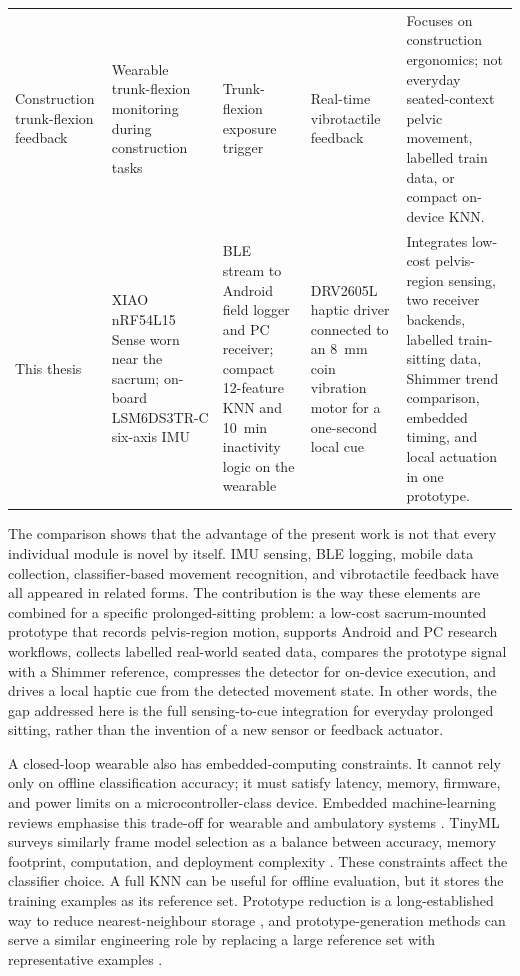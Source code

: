 \begin{table}[!tbp]
\begin{tabularx}{\textwidth}{p{}p{}p{}p{}X}
        Construction trunk-flexion feedback \cite{patel2023trunk_flexion_vibrotactile}
            & Wearable trunk-flexion monitoring during construction tasks
            & Trunk-flexion exposure trigger
            & Real-time vibrotactile feedback
            & Focuses on construction ergonomics; not everyday seated-context pelvic movement, labelled train data, or compact on-device KNN. \\
        This thesis
            & XIAO nRF54L15 Sense worn near the sacrum; on-board LSM6DS3TR-C six-axis IMU
            & BLE stream to Android field logger and PC receiver; compact 12-feature KNN and 10~min inactivity logic on the wearable
            & DRV2605L haptic driver connected to an 8~mm coin vibration motor for a one-second local cue
            & Integrates low-cost pelvis-region sensing, two receiver backends, labelled train-sitting data, Shimmer trend comparison, embedded timing, and local actuation in one prototype. \\
        \bottomrule
    \end{tabularx}
\end{table}

The comparison shows that the advantage of the present work is not that every individual module is novel by itself. IMU sensing, BLE logging, mobile data collection, classifier-based movement recognition, and vibrotactile feedback have all appeared in related forms. The contribution is the way these elements are combined for a specific prolonged-sitting problem: a low-cost sacrum-mounted prototype that records pelvis-region motion, supports Android and PC research workflows, collects labelled real-world seated data, compares the prototype signal with a Shimmer reference, compresses the detector for on-device execution, and drives a local haptic cue from the detected movement state. In other words, the gap addressed here is the full sensing-to-cue integration for everyday prolonged sitting, rather than the invention of a new sensor or feedback actuator.

A closed-loop wearable also has embedded-computing constraints. It cannot rely only on offline classification accuracy; it must satisfy latency, memory, firmware, and power limits on a microcontroller-class device. Embedded machine-learning reviews emphasise this trade-off for wearable and ambulatory systems \cite{diab2022embedded}. TinyML surveys similarly frame model selection as a balance between accuracy, memory footprint, computation, and deployment complexity \cite{abadade2023tinyml}. These constraints affect the classifier choice. A full KNN can be useful for offline evaluation, but it stores the training examples as its reference set. Prototype reduction is a long-established way to reduce nearest-neighbour storage \cite{hart1968condensed}, and prototype-generation methods can serve a similar engineering role by replacing a large reference set with representative examples \cite{triguero2012prototype_generation}.

